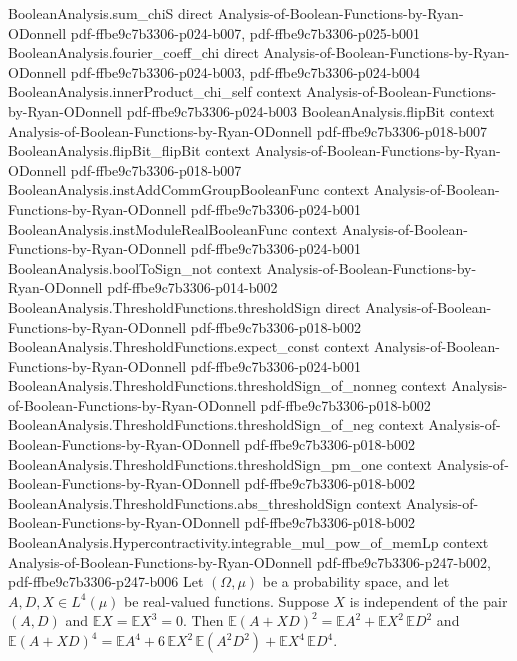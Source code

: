 \begin{theorem}
\proofstep
  {BooleanAnalysis.sum_chiS}
  {direct}
  {Analysis-of-Boolean-Functions-by-Ryan-ODonnell}
  {pdf-ffbe9c7b3306-p024-b007,
    pdf-ffbe9c7b3306-p025-b001}
\proofstep
  {BooleanAnalysis.fourier_coeff_chi}
  {direct}
  {Analysis-of-Boolean-Functions-by-Ryan-ODonnell}
  {pdf-ffbe9c7b3306-p024-b003,
    pdf-ffbe9c7b3306-p024-b004}
\proofstep
  {BooleanAnalysis.innerProduct_chi_self}
  {context}
  {Analysis-of-Boolean-Functions-by-Ryan-ODonnell}
  {pdf-ffbe9c7b3306-p024-b003}
\proofstep
  {BooleanAnalysis.flipBit}
  {context}
  {Analysis-of-Boolean-Functions-by-Ryan-ODonnell}
  {pdf-ffbe9c7b3306-p018-b007}
\proofstep
  {BooleanAnalysis.flipBit_flipBit}
  {context}
  {Analysis-of-Boolean-Functions-by-Ryan-ODonnell}
  {pdf-ffbe9c7b3306-p018-b007}
\proofstep
  {BooleanAnalysis.instAddCommGroupBooleanFunc}
  {context}
  {Analysis-of-Boolean-Functions-by-Ryan-ODonnell}
  {pdf-ffbe9c7b3306-p024-b001}
\proofstep
  {BooleanAnalysis.instModuleRealBooleanFunc}
  {context}
  {Analysis-of-Boolean-Functions-by-Ryan-ODonnell}
  {pdf-ffbe9c7b3306-p024-b001}
\proofstep
  {BooleanAnalysis.boolToSign_not}
  {context}
  {Analysis-of-Boolean-Functions-by-Ryan-ODonnell}
  {pdf-ffbe9c7b3306-p014-b002}
\proofstep
  {BooleanAnalysis.ThresholdFunctions.thresholdSign}
  {direct}
  {Analysis-of-Boolean-Functions-by-Ryan-ODonnell}
  {pdf-ffbe9c7b3306-p018-b002}
\proofstep
  {BooleanAnalysis.ThresholdFunctions.expect_const}
  {context}
  {Analysis-of-Boolean-Functions-by-Ryan-ODonnell}
  {pdf-ffbe9c7b3306-p024-b001}
\proofstep
  {BooleanAnalysis.ThresholdFunctions.thresholdSign_of_nonneg}
  {context}
  {Analysis-of-Boolean-Functions-by-Ryan-ODonnell}
  {pdf-ffbe9c7b3306-p018-b002}
\proofstep
  {BooleanAnalysis.ThresholdFunctions.thresholdSign_of_neg}
  {context}
  {Analysis-of-Boolean-Functions-by-Ryan-ODonnell}
  {pdf-ffbe9c7b3306-p018-b002}
\proofstep
  {BooleanAnalysis.ThresholdFunctions.thresholdSign_pm_one}
  {context}
  {Analysis-of-Boolean-Functions-by-Ryan-ODonnell}
  {pdf-ffbe9c7b3306-p018-b002}
\proofstep
  {BooleanAnalysis.ThresholdFunctions.abs_thresholdSign}
  {context}
  {Analysis-of-Boolean-Functions-by-Ryan-ODonnell}
  {pdf-ffbe9c7b3306-p018-b002}
\proofstep
  {BooleanAnalysis.Hypercontractivity.integrable_mul_pow_of_memLp}
  {context}
  {Analysis-of-Boolean-Functions-by-Ryan-ODonnell}
  {pdf-ffbe9c7b3306-p247-b002,
    pdf-ffbe9c7b3306-p247-b006}
Let $(\Omega,\mu)$ be a probability space, and let $A,D,X\in L^4(\mu)$ be real-valued
functions. Suppose $X$ is independent of the pair $(A,D)$ and
$\mathbb{E}X=\mathbb{E}X^3=0$. Then
$\mathbb{E}(A+XD)^2=\mathbb{E}A^2+\mathbb{E}X^2\,\mathbb{E}D^2$ and
$\mathbb{E}(A+XD)^4=\mathbb{E}A^4+6\,\mathbb{E}X^2\,\mathbb{E}(A^2D^2)+\mathbb{E}X^4\,\mathbb{E}D^4$.
\end{theorem}

